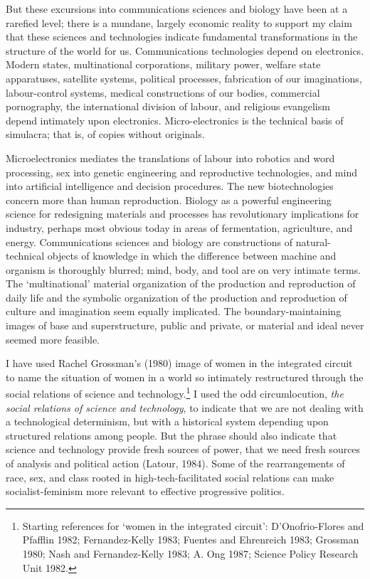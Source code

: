 \documentclass[DIV=12,%
               BCOR=10mm,%
               headinclude=false,%
               footinclude=false,open=any,%
               fontsize=11pt,%
               twoside,%
               paper=210mm:11in]%
               {scrbook}
\begin{document}
But these excursions into communications sciences and biology have been at a rarefied level; there is a mundane, largely economic reality to support my claim that these sciences and technologies indicate fundamental transformations in the structure of the world for us. Communications technologies depend on electronics. Modern states, multinational corporations, military power, welfare state apparatuses, satellite systems, political processes, fabrication of our imaginations, labour-control systems, medical constructions of our bodies, commercial pornography, the international division of labour, and religious evangelism depend intimately upon electronics. Micro-electronics is the technical basis of simulacra; that is, of copies without originals.


Microelectronics mediates the translations of labour into robotics and word processing, sex into genetic engineering and reproductive technologies, and mind into artificial intelligence and decision procedures. The new biotechnologies concern more than human reproduction. Biology as a powerful engineering science for redesigning materials and processes has revolutionary implications for industry, perhaps most obvious today in areas of fermentation, agriculture, and energy. Communications sciences and biology are constructions of natural-technical objects of knowledge in which the difference between machine and organism is thoroughly blurred; mind, body, and tool are on very intimate terms. The ‘multinational’ material organization of the production and reproduction of daily life and the symbolic organization of the production and reproduction of culture and imagination seem equally implicated. The boundary-maintaining images of base and superstructure, public and private, or material and ideal never seemed more feasible.


I have used Rachel Grossman’s (1980) image of women in the integrated circuit to name the situation of women in a world so intimately restructured through the social relations of science and technology.\footnote{Starting references for ‘women in the integrated circuit’: D’Onofrio-Flores and Pfafflin 1982; Fernandez-Kelly 1983; Fuentes and Ehrenreich 1983; Grossman 1980; Nash and Fernandez-Kelly 1983; A. Ong 1987; Science Policy Research Unit 1982.} I used the odd circumlocution, \emph{the social relations of science and technology}, to indicate that we are not dealing with a technological determinism, but with a historical system depending upon structured relations among people. But the phrase should also indicate that science and technology provide fresh sources of power, that we need fresh sources of analysis and political action (Latour, 1984). Some of the rearrangements of race, sex, and class rooted in high-tech-facilitated social relations can make socialist-feminism more relevant to effective progressive politics.
\end{document}
